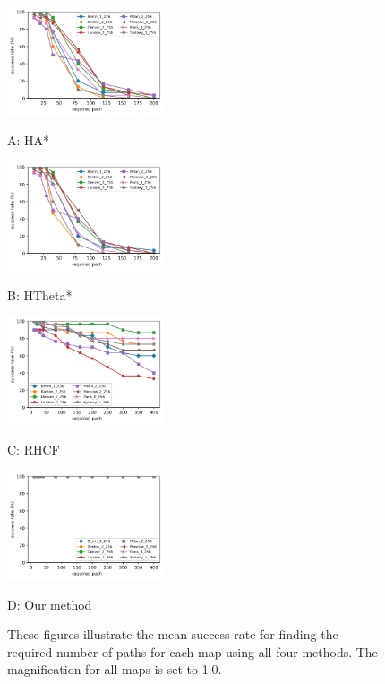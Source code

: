 \documentclass[letterpaper, 10 pt, journal, twoside]{IEEEtran}
\begin{document}
\begin{figure}[t] \scriptsize
\begin{minipage}{.245\linewidth}
  \centerline{\includegraphics[width=4.6cm]{HsAs_succ_and_count.png}}
  \centerline{A: HA*}
\end{minipage}
\hfill
\begin{minipage}{.245\linewidth}
  \centerline{\includegraphics[width=4.6cm]{HsTs_succ_and_count.png}}
  \centerline{B: HTheta*}
\end{minipage}
\hfill
\begin{minipage}{.245\linewidth}
  \centerline{\includegraphics[width=4.6cm]{RHCF_succ_and_count.png}}
  \centerline{C: RHCF}
\end{minipage}
\hfill
\begin{minipage}{.245\linewidth}
  \centerline{\includegraphics[width=4.6cm]{RJ_succ_and_count.png}}
  \centerline{D: Our method}
\end{minipage}
\vfill

\caption{These figures illustrate the mean success rate for finding the required number of paths for each map using all four methods. The magnification for all maps is set to 1.0. 
}
\label{succ_and_path_count}
\end{figure}
\end{document}
